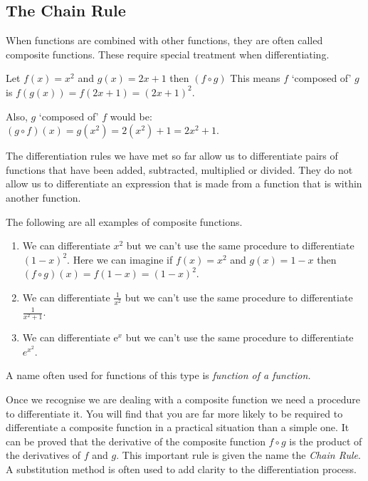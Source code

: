 \subsection*{The Chain Rule}
When functions are combined with other functions, they are often called composite functions. These require special treatment when differentiating.

Let $f (x) =x^{2}$ and $g (x) =2 x +1$ then $\left (f \circ g\right )$ This means $f$ `composed of' $g$ is $f \left (g \left (x\right )\right ) =f (2 x +1) =\left (2 x +1\right )^{2}$. 

Also, $g$ `composed of' $f$ would be: $\left (g \circ f\right ) (x) =g \left (x^{2}\right ) =2 \left (x^{2}\right ) +1 =2 x^{2} +1$. 

The differentiation rules we have met so far allow us to differentiate pairs of functions that have been added, subtracted, multiplied or divided. They do not allow us to differentiate an expression that is made from a function that is within another function.

The following are all examples of composite functions. 
\begin{enumerate}
\item We can differentiate $x^{2}$ but we can't use the same procedure to differentiate $\left (1 -x\right )^{2}$. Here we can imagine if  $f (x) =x^{2}$ and $g (x) =1 -x$ then $\left (f \circ g\right ) (x) =f (1 -x) =\left (1 -x\right )^{2}$.

\item We can differentiate $\frac{1}{x^{2}}$ but we can't use the same procedure to differentiate $\frac{1}{x^{2} +1}$. 

\item We can differentiate e$^{x}$ but we can't use the same procedure to differentiate $e^{x^{2}}$. 
\end{enumerate}

A name often used for functions of this type is \emph{function of a function.} 

Once we recognise we are dealing with a composite function we need a procedure to differentiate it. You will find that you are far more likely to be required to differentiate a composite function in a practical situation than a simple one. It can be proved that the derivative of the composite function $f \circ g$ is the product of the derivatives of $f$ and $g$. This important rule is given the name the \emph{Chain Rule}. A substitution method is often used to add clarity to the differentiation process. 

